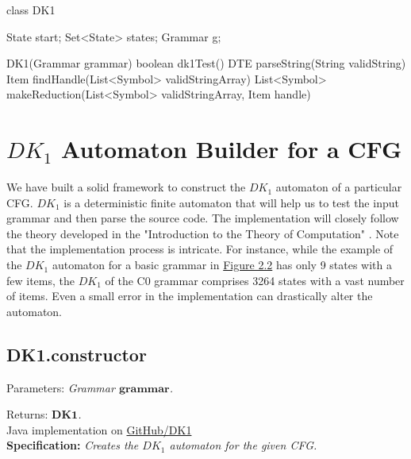 \begin{codeblock}
    class DK1 {
        State start;
        Set<State> states;
        Grammar g;

        DK1(Grammar grammar) {}
        boolean dk1Test() {}
        DTE parseString(String validString) {}
        Item findHandle(List<Symbol> validStringArray) {}
        List<Symbol> makeReduction(List<Symbol> validStringArray, Item handle) {}
    }
\end{codeblock}

\newpage


\section{\(DK_{1}\) Automaton Builder for a CFG}\label{sec:DK1 Automaton Builder for a CFG}

We have built a solid framework to construct the \(DK_{1}\) automaton of a particular CFG. \(DK_{1}\) is a deterministic finite automaton that will help us to test the input grammar and then parse the source code. The implementation will closely follow the theory developed in the "Introduction to the Theory of Computation" \cite{sipser}. Note that the implementation process is intricate. For instance, while the example of the \(DK_{1}\) automaton for a basic grammar in \hyperref[figure 3]{Figure 2.2} has only 9 states with a few items, the \(DK_{1}\) of the C0 grammar comprises 3264 states with a vast number of items. Even a small error in the implementation can drastically alter the automaton.

\vspace{10pt}

\subsection{DK1.constructor}

Parameters: \textit{Grammar \(\boldsymbol{grammar}\).}

Returns: \textit{\(\boldsymbol{DK1}\).}\\

Java implementation on \href{https://github.com/fyfsb/dcfg/blob/main/src/main/java/dk/DK1.java}{GitHub/DK1}\\

\textbf{Specification:} \textit{Creates the \(DK_{1}\) automaton for the given CFG.}\\

